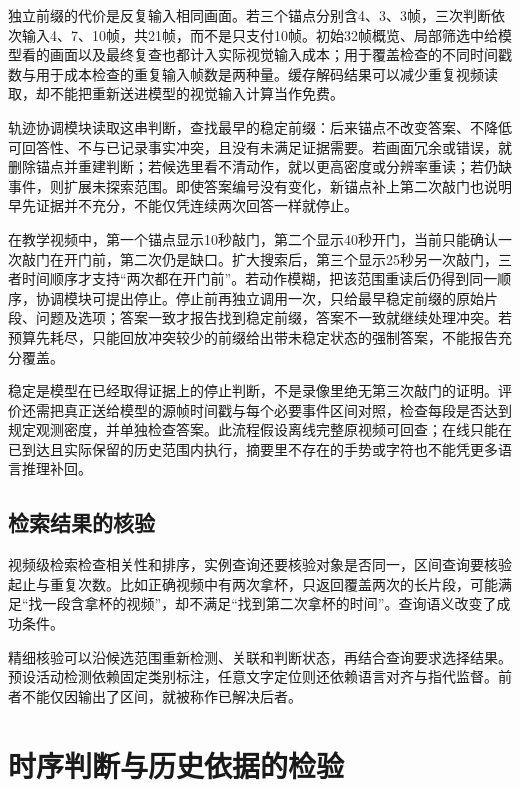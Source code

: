 独立前缀的代价是反复输入相同画面。若三个锚点分别含4、3、3帧，三次判断依次输入4、7、10帧，共21帧，而不是只支付10帧。初始32帧概览、局部筛选中给模型看的画面以及最终复查也都计入实际视觉输入成本；用于覆盖检查的不同时间戳数与用于成本检查的重复输入帧数是两种量。缓存解码结果可以减少重复视频读取，却不能把重新送进模型的视觉输入计算当作免费。

轨迹协调模块读取这串判断，查找最早的稳定前缀：后来锚点不改变答案、不降低可回答性、不与已记录事实冲突，且没有未满足证据需要。若画面冗余或错误，就删除锚点并重建判断；若候选里看不清动作，就以更高密度或分辨率重读；若仍缺事件，则扩展未探索范围。即使答案编号没有变化，新锚点补上第二次敲门也说明早先证据并不充分，不能仅凭连续两次回答一样就停止。

在教学视频中，第一个锚点显示10秒敲门，第二个显示40秒开门，当前只能确认一次敲门在开门前，第二次仍是缺口。扩大搜索后，第三个显示25秒另一次敲门，三者时间顺序才支持“两次都在开门前”。若动作模糊，把该范围重读后仍得到同一顺序，协调模块可提出停止。停止前再独立调用一次，只给最早稳定前缀的原始片段、问题及选项；答案一致才报告找到稳定前缀，答案不一致就继续处理冲突。若预算先耗尽，只能回放冲突较少的前缀给出带未稳定状态的强制答案，不能报告充分覆盖。

稳定是模型在已经取得证据上的停止判断，不是录像里绝无第三次敲门的证明。评价还需把真正送给模型的源帧时间戳与每个必要事件区间对照，检查每段是否达到规定观测密度，并单独检查答案。此流程假设离线完整原视频可回查；在线只能在已到达且实际保留的历史范围内执行，摘要里不存在的手势或字符也不能凭更多语言推理补回。

\subsection{检索结果的核验}
\label{sec:vision-video-retrieval-check}

视频级检索检查相关性和排序，实例查询还要核验对象是否同一，区间查询要核验起止与重复次数。比如正确视频中有两次拿杯，只返回覆盖两次的长片段，可能满足“找一段含拿杯的视频”，却不满足“找到第二次拿杯的时间”。查询语义改变了成功条件。

精细核验可以沿候选范围重新检测、关联和判断状态，再结合查询要求选择结果。预设活动检测依赖固定类别标注，任意文字定位则还依赖语言对齐与指代监督。前者不能仅因输出了区间，就被称作已解决后者。

\section{时序判断与历史依据的检验}
\label{sec:vision-video-evaluation}

